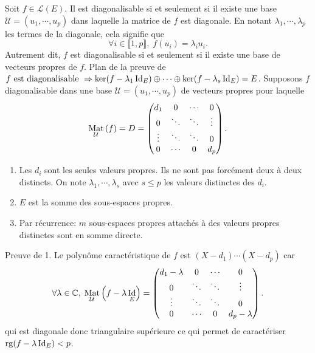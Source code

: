 \begin{demo}
  Soit $f\in \mathcal{L}(E)$. Il est diagonalisable si et seulement si il existe une base $\mathcal{U}=(u_1, \cdots, u_p)$ dans laquelle la matrice de $f$ est diagonale. En notant $\lambda_1, \cdots, \lambda_p$ les termes de la diagonale, cela signifie que
\[
  \forall i \in \llbracket 1,p \rrbracket, \; f(u_i) = \lambda_i u_i.
\]
Autrement dit, $f$ est diagonalisable si et seulement si il existe une base de vecteurs propres de $f$.\medskip\newline 
\indent \textbullet\hspace{0.5cm} Plan de la preuve de $f \text{ est diagonalisable } \Rightarrow \ker(f-\lambda_1 \mathop{\mathrm{Id}}_E) \oplus \cdots \oplus \ker(f-\lambda_s \mathop{\mathrm{Id}}_E) = E$.\newline
Supposons $f$ diagonalisable dans une base $\mathcal{U}=(u_1, \cdots, u_p)$ de vecteurs propres pour laquelle
\[
  \mathop{\mathrm{Mat}}_{\mathcal{U}}\left( f\right) = D =
  \begin{pmatrix}
          d_1 & 0      & \cdots & 0        \\
            0 & \ddots & \ddots & \vdots   \\
    \vdots    & \ddots & \ddots &    0     \\
      0       & \cdots &   0    & d_p 
  \end{pmatrix}.
\]
\begin{enumerate}
  \item Les $d_i$ sont les seules valeurs propres. Ils ne sont pas forcément deux à deux distincts. On note $\lambda_1, \cdots, \lambda_s$ avec $s \leq p$ les valeurs distinctes des $d_i$.
  \item $E$ est la somme des sous-espaces propres.
  \item Par récurrence: $m$ sous-espaces propres attachés à des valeurs propres distinctes sont en somme directe.
\end{enumerate} 
Preuve de 1.\newline
Le polynôme caractéristique de $f$ est $(X-d_1)\cdots(X-d_p)$ car
\[
\forall \lambda \in \mathbb{C},\;
\mathop{\mathrm{Mat}}_{\mathcal{U}}\left( f-\lambda\mathop{\mathrm{Id}}_E\right)=
  \begin{pmatrix}
  d_1 - \lambda & 0      & \cdots & 0        \\
              0 & \ddots & \ddots & \vdots   \\
      \vdots    & \ddots & \ddots &    0     \\
        0       & \cdots &   0    & d_p - \lambda 
  \end{pmatrix}.  
\]
qui est diagonale donc triangulaire supérieure ce qui permet de caractériser $\mathop{\mathrm{rg}}(f-\lambda \mathop{\mathrm{Id}}_E) < p$.\medskip\newline

\end{demo}
